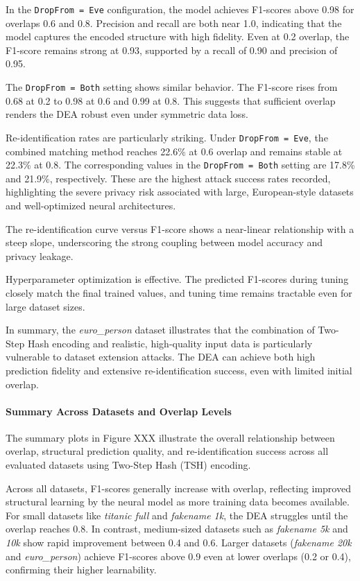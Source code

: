 In the \texttt{DropFrom = Eve} configuration, the model achieves F1-scores above 0.98 for overlaps 0.6 and 0.8. Precision and recall are both near 1.0, indicating that the model captures the encoded structure with high fidelity. Even at 0.2 overlap, the F1-score remains strong at 0.93, supported by a recall of 0.90 and precision of 0.95.

The \texttt{DropFrom = Both} setting shows similar behavior. The F1-score rises from 0.68 at 0.2 to 0.98 at 0.6 and 0.99 at 0.8. This suggests that sufficient overlap renders the DEA robust even under symmetric data loss.

Re-identification rates are particularly striking. Under \texttt{DropFrom = Eve}, the combined matching method reaches 22.6\% at 0.6 overlap and remains stable at 22.3\% at 0.8. The corresponding values in the \texttt{DropFrom = Both} setting are 17.8\% and 21.9\%, respectively. These are the highest attack success rates recorded, highlighting the severe privacy risk associated with large, European-style datasets and well-optimized neural architectures.

The re-identification curve versus F1-score shows a near-linear relationship with a steep slope, underscoring the strong coupling between model accuracy and privacy leakage.

Hyperparameter optimization is effective. The predicted F1-scores during tuning closely match the final trained values, and tuning time remains tractable even for large dataset sizes.

In summary, the \textit{euro\_person} dataset illustrates that the combination of Two-Step Hash encoding and realistic, high-quality input data is particularly vulnerable to dataset extension attacks. The DEA can achieve both high prediction fidelity and extensive re-identification success, even with limited initial overlap.

\paragraph{Summary Across Datasets and Overlap Levels}

The summary plots in Figure XXX illustrate the overall relationship between overlap, structural prediction quality, and re-identification success across all evaluated datasets using Two-Step Hash (TSH) encoding.

Across all datasets, F1-scores generally increase with overlap, reflecting improved structural learning by the neural model as more training data becomes available. For small datasets like \textit{titanic full} and \textit{fakename 1k}, the DEA struggles until the overlap reaches 0.8. In contrast, medium-sized datasets such as \textit{fakename 5k} and \textit{10k} show rapid improvement between 0.4 and 0.6. Larger datasets (\textit{fakename 20k} and \textit{euro\_person}) achieve F1-scores above 0.9 even at lower overlaps (0.2 or 0.4), confirming their higher learnability.


